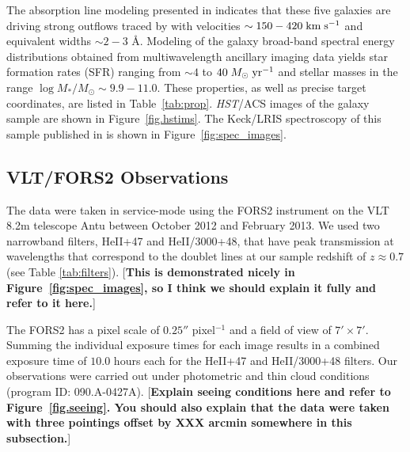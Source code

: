 \documentclass[twocolumn]{aastex6}
\def \mkms {{\rm \; km\;s^{-1}}}
\def \msunperyr {{\; M_{\odot}\rm \;yr^{-1}}}
\begin{document}
The absorption line modeling presented in \cite{Rubin_2014} indicates that these five galaxies are driving strong outflows traced by   with velocities $\sim150-420\mkms$ and equivalent widths $\sim 2-3$ \AA.  Modeling of the galaxy broad-band spectral energy distributions obtained from multiwavelength ancillary imaging data yields star formation rates (SFR) ranging from $\sim4$ to $40\msunperyr$ and stellar masses in the range $\log M_*/M_{\odot}\sim 9.9-11.0$.  These properties, as well as precise target coordinates, are listed in Table~\ref{tab:prop}.  \emph{HST}/ACS images of the galaxy sample are shown in 
Figure~\ref{fig.hstims}.  The Keck/LRIS spectroscopy of this sample published in \cite{Rubin_2014} is shown in Figure~\ref{fig:spec_images}.




%

\subsection{VLT/FORS2 Observations}
The data were taken in service-mode using the FORS2 instrument on the VLT 8.2m telescope Antu between October 2012 and February 2013. 
%
We used two narrowband filters, HeII+47 and HeII/3000+48, that have peak transmission at wavelengths that correspond to the  doublet lines at our sample redshift of $z\approx 0.7$ (see Table \ref{tab:filters}).
[{\bf This is demonstrated nicely in Figure~\ref{fig:spec_images}, so I think we should explain it fully and refer to it here.}]

%
The FORS2 has a pixel scale of $0.25''$ pixel$^{-1}$ and a field of view of $7'\times7'$.
%
Summing the individual exposure times for each image results in a combined exposure time of $10.0$ hours each for the HeII+47 and HeII/3000+48 filters.
%
Our observations were carried out under photometric and thin cloud conditions (program ID: 090.A-0427A).
[{\bf Explain seeing conditions here and refer to Figure~\ref{fig.seeing}.  You should also explain that the data were taken with three pointings offset by XXX arcmin somewhere in this subsection.}]
\end{document}
